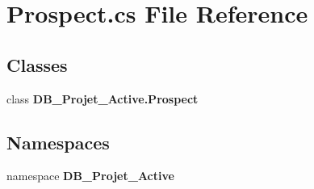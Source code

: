\section{Prospect.\+cs File Reference}
\label{_prospect_8cs}
\subsection*{Classes}
\begin{DoxyCompactItemize}
\item 
class \textbf{ D\+B\+\_\+\+Projet\+\_\+\+Active.\+Prospect}
\end{DoxyCompactItemize}
\subsection*{Namespaces}
\begin{DoxyCompactItemize}
\item 
namespace \textbf{ D\+B\+\_\+\+Projet\+\_\+\+Active}
\end{DoxyCompactItemize}
